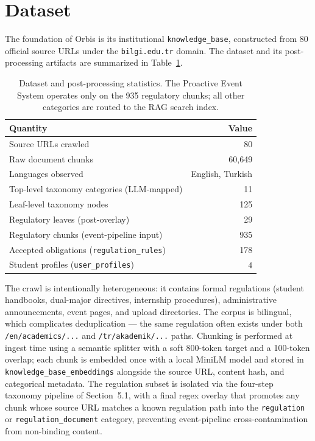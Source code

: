 \documentclass[a4paper,12pt]{article}
\begin{document}
\section{Dataset}
The foundation of Orbis is its institutional \texttt{knowledge\_base}, constructed from 80 official source URLs under the \texttt{bilgi.edu.tr} domain. The dataset and its post-processing artifacts are summarized in Table~\ref{tab:dataset_stats}.

\begin{table}[H]
\centering
\begin{tabular}{lr}
\toprule
Quantity & Value \\ \midrule
Source URLs crawled & 80 \\
Raw document chunks & 60{,}649 \\
Languages observed & English, Turkish \\
Top-level taxonomy categories (LLM-mapped) & 11 \\
Leaf-level taxonomy nodes & 125 \\
Regulatory leaves (post-overlay) & 29 \\
Regulatory chunks (event-pipeline input) & 935 \\
Accepted obligations (\texttt{regulation\_rules}) & 178 \\
Student profiles (\texttt{user\_profiles}) & 4 \\
\bottomrule
\end{tabular}
\caption{Dataset and post-processing statistics. The Proactive Event System operates only on the 935 regulatory chunks; all other categories are routed to the RAG search index.}
\label{tab:dataset_stats}
\end{table}

The crawl is intentionally heterogeneous: it contains formal regulations (student handbooks, dual-major directives, internship procedures), administrative announcements, event pages, and upload directories. The corpus is bilingual, which complicates deduplication --- the same regulation often exists under both \texttt{/en/academics/...} and \texttt{/tr/akademik/...} paths. Chunking is performed at ingest time using a semantic splitter with a soft 800-token target and a 100-token overlap; each chunk is embedded once with a local MiniLM model and stored in \texttt{knowledge\_base\_embeddings} alongside the source URL, content hash, and categorical metadata. The regulation subset is isolated via the four-step taxonomy pipeline of Section~5.1, with a final regex overlay that promotes any chunk whose source URL matches a known regulation path into the \texttt{regulation} or \texttt{regulation\_document} category, preventing event-pipeline cross-contamination from non-binding content.
\end{document}
